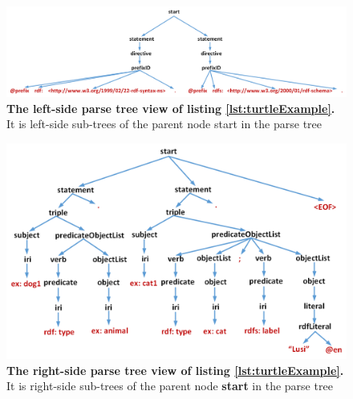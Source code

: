 \begin{figure}
		\centering\includegraphics[width=1.12\linewidth]{images/implementationParseTreeLeft.png}
		\caption{\textbf{The left-side parse tree view of listing \ref{lst:turtleExample}.} It is left-side sub-trees of the parent node start in the parse tree}
	\label{Fig:implementationParseTreeLeft}
\end{figure}

\begin{figure}
		\includegraphics[width=1\linewidth]{images/implementationParseTreeRight.png}
	\caption{\textbf{The right-side parse tree view of listing \ref{lst:turtleExample}.} It is right-side sub-trees of the parent node \textbf{start} in the parse tree}
	\label{Fig:implementationParseTreeRight}

\end{figure}

